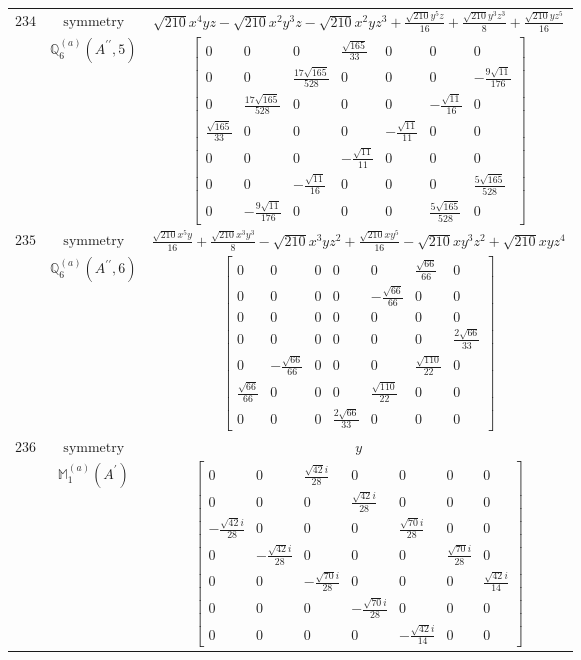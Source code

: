 \documentclass[fleqn,8pt,landscape]{jsarticle}
\begin{document}
\begin{longtable}{ccc}
$ 234 $ & $ \text{symmetry} $ & $ \sqrt{210} x^{4} y z - \sqrt{210} x^{2} y^{3} z - \sqrt{210} x^{2} y z^{3} + \frac{\sqrt{210} y^{5} z}{16} + \frac{\sqrt{210} y^{3} z^{3}}{8} + \frac{\sqrt{210} y z^{5}}{16} $ \\
$  $ & $ \mathbb{Q}_{6}^{(a)}(A^{\prime\prime},5) $ & $ \begin{bmatrix} 0 & 0 & 0 & \frac{\sqrt{165}}{33} & 0 & 0 & 0 \\ 0 & 0 & \frac{17 \sqrt{165}}{528} & 0 & 0 & 0 & - \frac{9 \sqrt{11}}{176} \\ 0 & \frac{17 \sqrt{165}}{528} & 0 & 0 & 0 & - \frac{\sqrt{11}}{16} & 0 \\ \frac{\sqrt{165}}{33} & 0 & 0 & 0 & - \frac{\sqrt{11}}{11} & 0 & 0 \\ 0 & 0 & 0 & - \frac{\sqrt{11}}{11} & 0 & 0 & 0 \\ 0 & 0 & - \frac{\sqrt{11}}{16} & 0 & 0 & 0 & \frac{5 \sqrt{165}}{528} \\ 0 & - \frac{9 \sqrt{11}}{176} & 0 & 0 & 0 & \frac{5 \sqrt{165}}{528} & 0 \end{bmatrix} $ \\ \hline
$ 235 $ & $ \text{symmetry} $ & $ \frac{\sqrt{210} x^{5} y}{16} + \frac{\sqrt{210} x^{3} y^{3}}{8} - \sqrt{210} x^{3} y z^{2} + \frac{\sqrt{210} x y^{5}}{16} - \sqrt{210} x y^{3} z^{2} + \sqrt{210} x y z^{4} $ \\
$  $ & $ \mathbb{Q}_{6}^{(a)}(A^{\prime\prime},6) $ & $ \begin{bmatrix} 0 & 0 & 0 & 0 & 0 & \frac{\sqrt{66}}{66} & 0 \\ 0 & 0 & 0 & 0 & - \frac{\sqrt{66}}{66} & 0 & 0 \\ 0 & 0 & 0 & 0 & 0 & 0 & 0 \\ 0 & 0 & 0 & 0 & 0 & 0 & \frac{2 \sqrt{66}}{33} \\ 0 & - \frac{\sqrt{66}}{66} & 0 & 0 & 0 & \frac{\sqrt{110}}{22} & 0 \\ \frac{\sqrt{66}}{66} & 0 & 0 & 0 & \frac{\sqrt{110}}{22} & 0 & 0 \\ 0 & 0 & 0 & \frac{2 \sqrt{66}}{33} & 0 & 0 & 0 \end{bmatrix} $ \\ \hline
$ 236 $ & $ \text{symmetry} $ & $ y $ \\
$  $ & $ \mathbb{M}_{1}^{(a)}(A^{\prime}) $ & $ \begin{bmatrix} 0 & 0 & \frac{\sqrt{42} i}{28} & 0 & 0 & 0 & 0 \\ 0 & 0 & 0 & \frac{\sqrt{42} i}{28} & 0 & 0 & 0 \\ - \frac{\sqrt{42} i}{28} & 0 & 0 & 0 & \frac{\sqrt{70} i}{28} & 0 & 0 \\ 0 & - \frac{\sqrt{42} i}{28} & 0 & 0 & 0 & \frac{\sqrt{70} i}{28} & 0 \\ 0 & 0 & - \frac{\sqrt{70} i}{28} & 0 & 0 & 0 & \frac{\sqrt{42} i}{14} \\ 0 & 0 & 0 & - \frac{\sqrt{70} i}{28} & 0 & 0 & 0 \\ 0 & 0 & 0 & 0 & - \frac{\sqrt{42} i}{14} & 0 & 0 \end{bmatrix} $ \\ \hline

\end{longtable}
\end{document}
